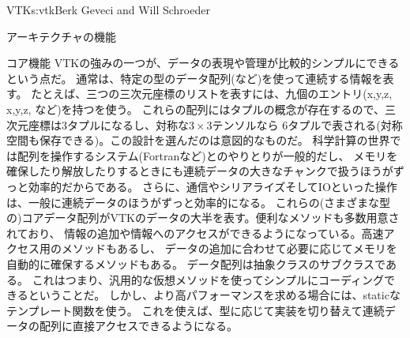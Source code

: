 \begin{aosachapter}{VTK}{s:vtk}{Berk Geveci and Will Schroeder}
\begin{aosasect1}{アーキテクチャの機能}
\begin{aosasect2}{コア機能}
VTKの強みの一つが、データの表現や管理が比較的シンプルにできるという点だ。
通常は、特定の型のデータ配列(など)を使って連続する情報を表す。
たとえば、三つの三次元座標のリストを表すには、九個のエントリ(x,y,z, x,y,z, など)を持つを使う。
これらの配列にはタプルの概念が存在するので、三次元座標は3タプルになるし、対称な$3{\times}3$テンソルなら
6タプルで表される(対称空間も保存できる)。この設計を選んだのは意図的なものだ。
科学計算の世界では配列を操作するシステム(Fortranなど)とのやりとりが一般的だし、
メモリを確保したり解放したりするときにも連続データの大きなチャンクで扱うほうがずっと効率的だからである。
さらに、通信やシリアライズそしてIOといった操作は、一般に連続データのほうがずっと効率的になる。
これらの(さまざまな型の)コアデータ配列がVTKのデータの大半を表す。便利なメソッドも多数用意されており、
情報の追加や情報へのアクセスができるようになっている。高速アクセス用のメソッドもあるし、
データの追加に合わせて必要に応じてメモリを自動的に確保するメソッドもある。
データ配列は抽象クラスのサブクラスである。
これはつまり、汎用的な仮想メソッドを使ってシンプルにコーディングできるということだ。
しかし、より高パフォーマンスを求める場合には、staticなテンプレート関数を使う。
これを使えば、型に応じて実装を切り替えて連続データの配列に直接アクセスできるようになる。


\end{aosasect2}
\end{aosasect1}
\end{aosachapter}
